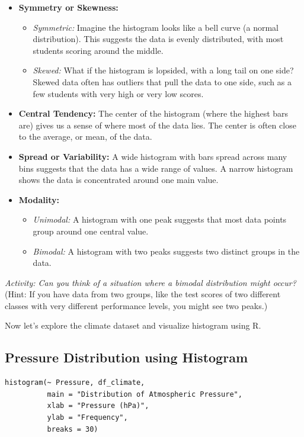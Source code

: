 \begin{itemize}
    \item \textbf{Symmetry or Skewness:}
    \begin{itemize}
        \item \textit{Symmetric:} Imagine the histogram looks like a bell curve (a normal distribution). This suggests the data is evenly distributed, with most students scoring around the middle.
        \item \textit{Skewed:} What if the histogram is lopsided, with a long tail on one side? Skewed data often has outliers that pull the data to one side, such as a few students with very high or very low scores.
    \end{itemize}
    \item \textbf{Central Tendency:} The center of the histogram (where the highest bars are) gives us a sense of where most of the data lies. The center is often close to the average, or mean, of the data.
    \item \textbf{Spread or Variability:} A wide histogram with bars spread across many bins suggests that the data has a wide range of values. A narrow histogram shows the data is concentrated around one main value.
    \item \textbf{Modality:}
    \begin{itemize}
        \item \textit{Unimodal:} A histogram with one peak suggests that most data points group around one central value.
        \item \textit{Bimodal:} A histogram with two peaks suggests two distinct groups in the data.
    \end{itemize}
\end{itemize}

\textit{Activity: Can you think of a situation where a bimodal distribution might occur?} (Hint: If you have data from two groups, like the test scores of two different classes with very different performance levels, you might see two peaks.)

Now let’s explore the climate dataset and visualize histogram using R.

\subsection*{Pressure Distribution using Histogram}

\begin{verbatim}
histogram(~ Pressure, df_climate,
          main = "Distribution of Atmospheric Pressure",
          xlab = "Pressure (hPa)",
          ylab = "Frequency",
          breaks = 30)
\end{verbatim}

